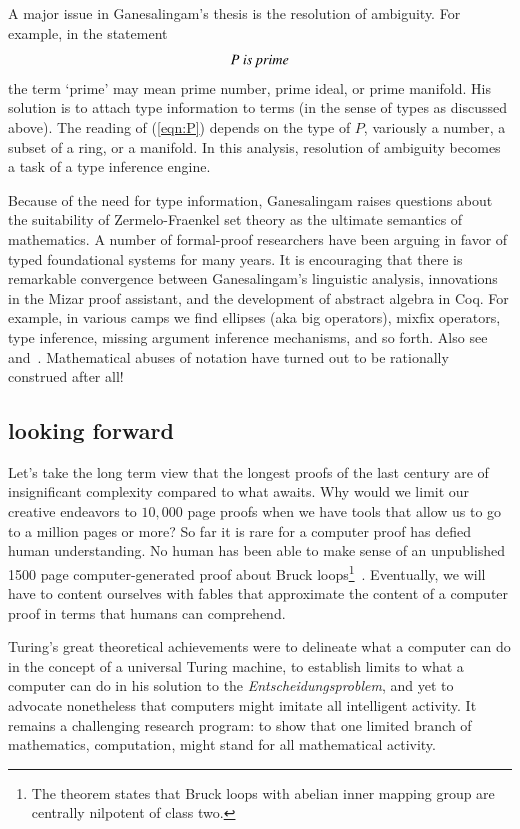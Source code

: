 \documentclass{llncs}
\begin{document}
A major issue in Ganesalingam's thesis is the resolution of ambiguity.
For example, in the statement
\begin{equation}\label{eqn:P}
P \text{\it ~is prime}
\end{equation}
the term `prime' may mean prime number, prime ideal, or prime
manifold.  His solution is to attach type information to terms (in the
sense of types as discussed above).  The reading of (\ref{eqn:P})
depends on the type of $P$, variously a number, a subset of a ring, or
a manifold.  In this analysis, resolution of ambiguity becomes a task
of a type inference engine.

Because of the need for type information, Ganesalingam raises
questions about the suitability of Zermelo-Fraenkel set theory as the
ultimate semantics of mathematics.  A number of formal-proof
researchers have been arguing in favor of typed foundational systems
for many years.  It is encouraging that there is remarkable
convergence between Ganesalingam's linguistic analysis, innovations in
the Mizar proof assistant, and the development of abstract algebra in
Coq. For example, in various camps we find ellipses (aka big
operators), mixfix operators, type inference, missing argument
inference mechanisms, and so forth.  Also see~\cite{Hoe11}
and~\cite{Forthel}.  Mathematical abuses of notation have turned out
to be rationally construed after all!




\subsection{looking forward}

Let's take the long term view that the longest proofs of the last
century are of insignificant complexity compared to what awaits.  Why
would we limit our creative endeavors to $10,000$ page proofs when we
have tools that allow us to go to a million pages or more?  So far it
is rare for a computer proof has defied human understanding.  No human
has been able to make sense of an unpublished 1500 page
computer-generated proof about Bruck loops\footnote{The theorem states
  that Bruck loops with abelian inner mapping group are centrally
  nilpotent of class two.}~\cite{Stan}.  Eventually, we will have to
content ourselves with fables that approximate the content of a
computer proof in terms that humans can comprehend.


Turing's great theoretical achievements were to delineate what a
computer can do in the concept of a universal Turing machine, to
establish limits to what a computer can do in his solution to the {\it
  Entscheidungsproblem}, and yet to advocate nonetheless that
computers might imitate all intelligent activity. It remains a
challenging research program: to show that one limited branch of
mathematics, computation, might stand for all mathematical activity.
\end{document}
